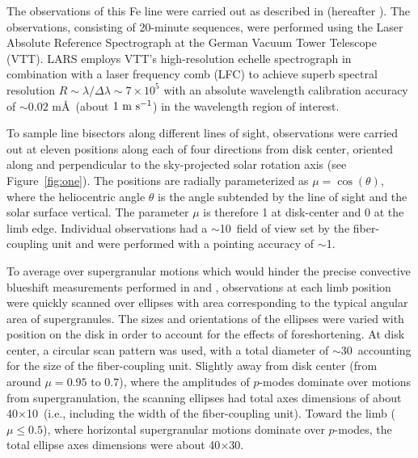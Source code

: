 \documentclass[twocolumn]{aastex63}
\newcommand{\ms}{{\rm m\ s}^{-1}}
\newcommand{\revise}[1]{#1}
\begin{document}
% 

The observations of this Fe line were carried out as described in \citealt{Lohner-Bottcher2018} (hereafter ). The observations\revise{, consisting of 20-minute sequences,} were performed using the Laser Absolute Reference Spectrograph \citep[LARS,][]{Doerr2015, Lohner-Bottcher2017} at the German Vacuum Tower Telescope (VTT). LARS employs VTT's high-resolution echelle spectrograph in combination with a laser frequency comb (LFC) to achieve superb spectral resolution $R \sim \lambda/\Delta\lambda \sim 7 \times10^{5}$ with an absolute wavelength calibration accuracy of $\sim$$0.02$ m\AA\ (about $1\ \ms$) in the wavelength region of interest. \par 

To sample line bisectors along different lines of sight, observations were carried out at eleven positions along each of four directions from disk center, oriented along and perpendicular to the sky-projected solar rotation axis (see Figure~\ref{fig:one}). The positions are radially parameterized as $\mu = \cos(\theta)$, where the heliocentric angle $\theta$ is the angle subtended by the line of sight and the solar surface vertical. The parameter $\mu$ is therefore 1 at disk-center and 0 at the limb edge. Individual observations \revise{had a $\sim$10\arcsec\ field of view set by the fiber-coupling unit and} were performed with a pointing accuracy of $\sim$1\arcsec. \par

To average over supergranular motions which would hinder the precise convective blueshift measurements performed in  and , observations at each limb position were quickly scanned over ellipses with area corresponding to the typical angular area of supergranules. \revise{The sizes and orientations of the ellipses were varied with position on the disk in order to account for the effects of foreshortening. At disk center, a circular scan pattern was used, with a total diameter of $\sim$30\arcsec\ accounting for the size of the fiber-coupling unit. Slightly away from disk center (from around $\mu = 0.95$ to $0.7$), where the amplitudes of $p$-modes dominate over motions from supergranulation, the scanning ellipses had total axes dimensions of about 40\arcsec$\times$10\arcsec\ (i.e., including the width of the fiber-coupling unit). Toward the limb ($\mu \leq 0.5$), where horizontal supergranular motions dominate over $p$-modes, the total ellipse axes dimensions were about 40\arcsec$\times$30\arcsec.} \par 
\end{document}
